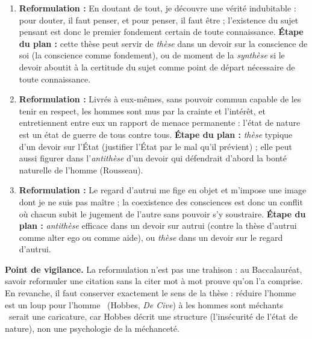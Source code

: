 \documentclass[11pt]{article}
\begin{document}
\begin{corrige}
\begin{enumerate}
\item \textbf{Reformulation :} En doutant de tout, je découvre une vérité indubitable : pour douter, il faut penser, et pour penser, il faut être ; l'existence du sujet pensant est donc le premier fondement certain de toute connaissance. \textbf{Étape du plan :} cette thèse peut servir de \emph{thèse} dans un devoir sur la conscience de soi (la conscience comme fondement), ou de moment de la \emph{synthèse} si le devoir aboutit à la certitude du sujet comme point de départ nécessaire de toute connaissance.
\item \textbf{Reformulation :} Livrés à eux-mêmes, sans pouvoir commun capable de les tenir en respect, les hommes sont mus par la crainte et l'intérêt, et entretiennent entre eux un rapport de menace permanente : l'état de nature est un état de guerre de tous contre tous. \textbf{Étape du plan :} \emph{thèse} typique d'un devoir sur l'État (justifier l'État par le mal qu'il prévient) ; elle peut aussi figurer dans l'\emph{antithèse} d'un devoir qui défendrait d'abord la bonté naturelle de l'homme (Rousseau).
\item \textbf{Reformulation :} Le regard d'autrui me fige en objet et m'impose une image dont je ne suis pas maître ; la coexistence des consciences est donc un conflit où chacun subit le jugement de l'autre sans pouvoir s'y soustraire. \textbf{Étape du plan :} \emph{antithèse} efficace dans un devoir sur autrui (contre la thèse d'autrui comme alter ego ou comme aide), ou \emph{thèse} dans un devoir sur le regard d'autrui.
\end{enumerate}
\textbf{Point de vigilance.} La reformulation n'est pas une trahison : au Baccalauréat, savoir reformuler une citation sans la citer mot à mot prouve qu'on l'a comprise. En revanche, il faut conserver exactement le sens de la thèse : réduire \guillemotleft l'homme est un loup pour l'homme \guillemotright\ (Hobbes, \emph{De Cive}) à \guillemotleft les hommes sont méchants \guillemotright\ serait une caricature, car Hobbes décrit une structure (l'insécurité de l'état de nature), non une psychologie de la méchanceté.
\end{corrige}
\end{document}
